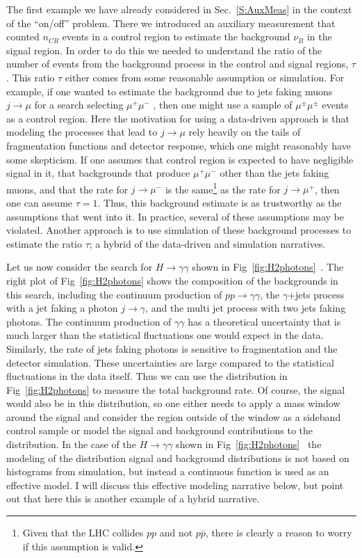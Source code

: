 The first example we have already considered in Sec.~\ref{S:AuxMeas} in the context of the ``on/off'' problem.  There we introduced an auxiliary measurement that counted $n_{CR}$ events in a  control region to estimate the background $\nu_B$ in the signal region.  In order to do this we needed to understand the ratio of the number of events from the background process in the control and signal regions, $\tau$.  This ratio $\tau$ either comes from some reasonable assumption or simulation.  For example, if one wanted to estimate the background due to jets faking muons $j\to\mu$ for a search selecting $\mu^+\mu^-$ , then one might use a sample of $\mu^\pm\mu^\pm$ events as a control region.  Here the motivation for using a data-driven approach  is that modeling the processes that lead to $j\to\mu$ rely heavily on the tails of fragmentation functions and detector response, which one might reasonably have some skepticism.  If one assumes that control region is expected to have negligible signal in it, that backgrounds that produce $\mu^+\mu^-$ other than the jets faking muons, and that the rate for $j\to\mu^-$ is the same\footnote{Given that the LHC collides $pp$ and not $p\bar{p}$, there is clearly a reason to worry if this assumption is valid.} as the rate for $j\to\mu^+$, then one can assume $\tau=1$.  Thus, this background estimate is as trustworthy as the assumptions that went into it.    In practice, several of these assumptions may be violated.  Another approach is to use simulation of these background processes to estimate the ratio $\tau$; a hybrid of the data-driven and simulation narratives.


Let us now consider the search for $H\to\gamma\gamma$ shown in Fig~\ref{fig:H2photons}~\cite{ATLAS-CONF-2011-161,ATLAS:2012ad}.  The right plot of  Fig~\ref{fig:H2photons} shows the composition of the backgrounds in this search, including the continuum production of $pp\to\gamma\gamma$, the $\gamma$+jets process with a jet faking a photon $j\to\gamma$, and the multi jet process with two jets faking photons.  The continuum production of $\gamma\gamma$ has a  theoretical uncertainty that is much larger than the statistical fluctuations one would expect in the data.  Similarly, the rate of jets faking photons is sensitive to fragmentation and the detector simulation.  These uncertainties are large compared to the statistical fluctuations in the data itself.  Thus we can use the distribution in  Fig~\ref{fig:H2photons} to measure the total background rate.  Of course, the signal would also be in this distribution, so one either needs to apply a mass window around the signal and consider the region outside of the window as a sideband control sample or model the signal and background contributions to the distribution.  In the case of the   $H\to\gamma\gamma$ shown in Fig~\ref{fig:H2photons}~\cite{ATLAS-CONF-2011-161,ATLAS:2012ad} the modeling of the distribution signal and background distributions is not based on histograms from simulation, but instead a continuous function is used as an effective model.  I will discuss this effective modeling narrative below, but point out that here this is another example of a hybrid narrative.
